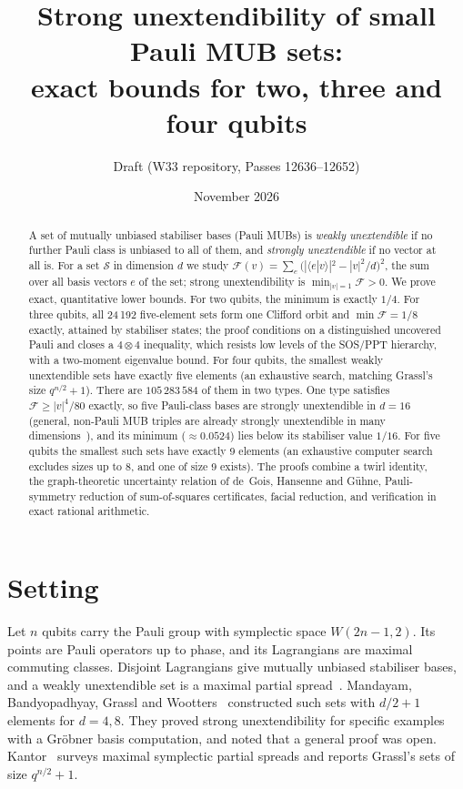 \documentclass[11pt]{article}
\title{Strong unextendibility of small Pauli MUB sets:\\ exact bounds for two, three and four qubits}
\author{Draft (W33 repository, Passes 12636--12652)}
\date{November 2026}
\theoremstyle{remark}\newtheorem*{remark}{Remark}
\newcommand{\F}{\mathcal{F}}
\begin{document}
\maketitle
\begin{abstract}
A set of mutually unbiased stabiliser bases (Pauli MUBs) is \emph{weakly unextendible} if no further Pauli class is unbiased to all of
them, and \emph{strongly unextendible} if no vector at all is. For a set $\mathcal{S}$ in dimension $d$ we study
$\F(v)=\sum_{e}\bigl(|\langle e|v\rangle|^2-|v|^2/d\bigr)^2$, the sum over all basis vectors $e$ of the set; strong unextendibility
is $\min_{|v|=1}\F>0$. We prove exact, quantitative lower bounds. For two qubits, the minimum is exactly $1/4$. For three qubits, all
24\,192 five-element sets form one Clifford orbit and $\min\F=1/8$ exactly, attained by stabiliser states; the proof conditions on a
distinguished uncovered Pauli and closes a $4\otimes4$ inequality, which resists low levels of the SOS/PPT hierarchy, with a two-moment
eigenvalue bound. For
four qubits, the smallest weakly unextendible sets have exactly five elements (an exhaustive search, matching Grassl's size
$q^{n/2}+1$). There are $105\,283\,584$ of them in two types. One type satisfies $\F\ge|v|^4/80$ exactly, so five Pauli-class bases are strongly
unextendible in $d=16$ (general, non-Pauli MUB triples are already strongly unextendible in many dimensions~\cite{gmmp}), and its minimum ($\approx0.0524$) lies below its stabiliser value $1/16$. For five qubits the smallest such sets have exactly 9 elements (an exhaustive computer search
excludes sizes up to 8, and one of size 9 exists). The proofs combine a twirl identity, the
graph-theoretic uncertainty relation of de~Gois, Hansenne and G\"uhne, Pauli-symmetry reduction of sum-of-squares certificates, facial
reduction, and verification in exact rational arithmetic.
\end{abstract}

\section{Setting}
Let $n$ qubits carry the Pauli group with symplectic space $W(2n-1,2)$. Its points are Pauli operators up to phase, and its
Lagrangians are maximal commuting classes. Disjoint Lagrangians give mutually unbiased stabiliser bases, and a weakly unextendible
set is a maximal partial spread~\cite{mbgw,thas}. Mandayam, Bandyopadhyay, Grassl and Wootters~\cite{mbgw} constructed such sets with
$d/2+1$ elements for $d=4,8$. They proved strong unextendibility for specific examples with a Gr\"obner basis computation, and
noted that a general proof was open. Kantor~\cite{kantor} surveys maximal symplectic partial spreads and reports Grassl's sets of
size $q^{n/2}+1$.
\end{document}
